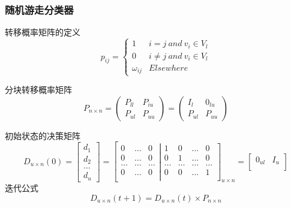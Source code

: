 \documentclass[notheorems, UTF8]{ctexbeamer}
\begin{document}
\begin{frame}
\frametitle{随机游走分类器}
转移概率矩阵的定义
\begin{displaymath}
p_{ij} = \left\{
\begin{array}{ll}
1 & i = j   \ and\ v_i \in V_l \\
0 & i \neq j\ and\ v_i \in V_l \\
\omega_{ij} & Elsewhere
\end{array}
\right .
\end{displaymath}

分块转移概率矩阵
\begin{displaymath}
P_{n \times n} = \left(
\begin{array}{ll}
P_{ll} & P_{iu}\\
P_{ul} & P_{uu} 
\end{array}
\right)=\left(
\begin{array}{ll}
I_{l}  & 0_{lu}\\
P_{ul} & P_{uu} 
\end{array}
\right)
\end{displaymath}

初始状态的决策矩阵
\begin{displaymath}
D_{u \times n}(0) = \left[
\begin{array}{c}
d_1 \\
d_2 \\
\ldots \\
d_u
\end{array}
\right] = \left[
\begin{array}{ccc}
0 & \ldots & 0\\
0 & \ldots & 0\\
\ldots & \ldots & \ldots\\
0 & \ldots & 0\\
\end{array}
\left | 
\begin{array}{cccc}
1 & 0 & \ldots & 0 \\
0 & 1 & \ldots & 0 \\
\ldots & \ldots &\ldots & \ldots \\
0 & 0 & \ldots & 1 \\
\end{array}
\right]_{u \times n} = 
\left[
\begin{array}{cc}
0_{u l} & I_{u} \\
\end{array}
\right ]\right.
\end{displaymath}
迭代公式
\begin{displaymath}
D_{u \times n}(t + 1) = D_{u \times n}(t) \times P_{n \times n}
\end{displaymath}
\end{frame}
\end{document}
